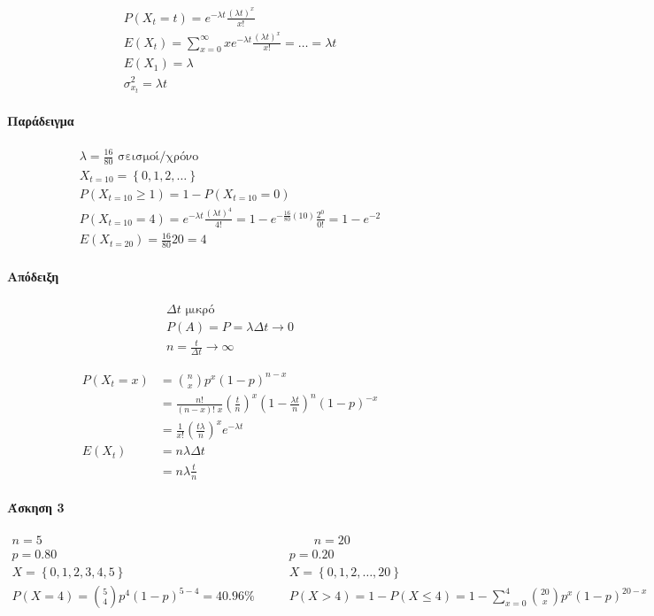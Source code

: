 \documentclass[11pt,a4paper,titlepage,draft]{article}
\begin{document}
\begin{gather*}
P(X_t=t) = e^{-\lambda t} \frac{(\lambda t)^x}{x!}\\
E(X_t) = \sum_{x=0}^\infty x e^{-\lambda t} \frac{(\lambda t)^x}{x!} = \dots = \lambda t\\
E(X_1)=\lambda\\
\sigma^2_{x_t} =\lambda t
\end{gather*}

\paragraph{Παράδειγμα}
\begin{gather*}
\lambda = \frac{16}{80} \text{ σεισμοί/χρόνο}\\
X_{t=10}= \left\lbrace 0,1,2,\dots \right\rbrace\\
P(X_{t=10} \geq 1) = 1- P(X_{t=10}=0)\\
P(X_{t=10} = 4) = e^{-\lambda t} \frac{(\lambda t)^4}{4!}=1-e^{-\frac{16}{80}(10)}\frac{2^0}{0!}=1-e^{-2}\\
E(X_{t=20})=\frac{16}{80}20=4
\end{gather*}


\paragraph{Απόδειξη}
\begin{align*}
\Delta t \text{ μικρό}\\
P(A) = P = \lambda \Delta t \to 0\\
n=\frac{t}{\Delta t} \to \infty
\end{align*}

\begin{align*}
P(X_t=x) &= \binom{n}{x} p^x (1-p)^{n-x}\\
&= \frac{n!}{(n-x)!\; x} \left( \frac{t}{n} \right)^x \left(1-\frac{\lambda t}{n}\right)^n (1-p)^{-x}\\
&= \frac{1}{x!} \left( \frac{t\lambda}{n}\right)^x e^{-\lambda t}\\
E(X_t)&=n\lambda \Delta t
\\ &= n\lambda \frac{t}{n}
\end{align*}

\paragraph{Άσκηση 3}
\[
\begin{array}{cc}
n=5
\qquad&\qquad
n=20
\\p=0.80&p=0.20\\X= \left\lbrace 0,1,2,3,4,5 \right\rbrace
& X= \left\lbrace 0,1,2,\dots,20 \right\rbrace\\
P(X=4) = \binom{5}{4} p^4(1-p)^{5-4} = 40.96\%
\qquad& P(X>4) = 1-P(X\leq4) = 1-\sum_{x=0}^4 \binom{20}{x} p^x(1-p)^{20-x}
\end{array}
\]
\end{document}
